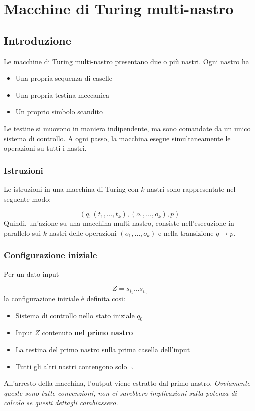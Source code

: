\chapter{Macchine di Turing multi-nastro}

\section{Introduzione}
Le macchine di Turing multi-nastro presentano due o più nastri. Ogni nastro ha

\begin{itemize}
	\item Una propria sequenza di caselle
	\item Una propria testina meccanica
	\item Un proprio simbolo scandito
\end{itemize}
%
Le testine si muovono in maniera indipendente, ma sono comandate da un unico sistema di controllo. A ogni passo, la macchina esegue simultaneamente le operazioni su tutti i nastri.

\subsection{Istruzioni}

Le istruzioni in una macchina di Turing con $k$ nastri sono rappresentate nel seguente modo:

$$
(q, (t_1, \dots, t_k), (o_1, \dots, o_k), p)
$$
%
Quindi, un'azione su una macchina multi-nastro, consiste nell'esecuzione in parallelo sui $k$ nastri delle operazioni $(o_1, \dots, o_k)$ e nella transizione $q\to p$.

\subsection{Configurazione iniziale}
Per un dato input

$$
Z = s_{i_1} \dots s_{i_n}
$$
%
la configurazione iniziale è definita cosi:

\begin{itemize}
	\item Sistema di controllo nello stato iniziale $q_0$
	\item Input $Z$ contenuto \textbf{nel primo nastro}
	\item La testina del primo nastro sulla prima casella dell'input
	\item Tutti gli altri nastri contengono solo $\square$.
\end{itemize}
%
All'arresto della macchina, l'output viene estratto dal primo nastro. \it Ovviamente queste sono tutte convenzioni, non ci sarebbero implicazioni sulla potenza di calcolo se questi dettagli cambiassero.\rm

